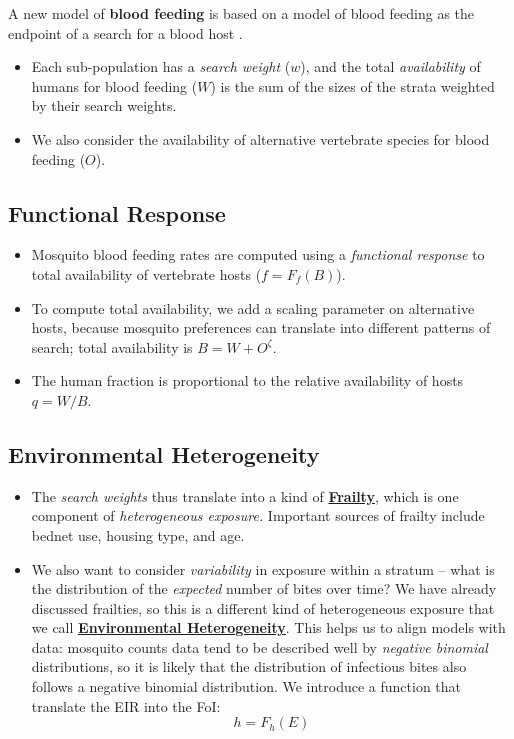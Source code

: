 \documentclass[
]{book}
\begin{document}
A new model of \textbf{blood feeding} is based on a model of blood feeding as the endpoint of a search for a blood host \autocite{WuSL2023SpatialDynamics}.

\begin{itemize}
\item
  Each sub-population has a \emph{search weight} (\(w\)), and the total \emph{availability} of humans for blood feeding (\(W\)) is the sum of the sizes of the strata weighted by their search weights.
\item
  We also consider the availability of alternative vertebrate species for blood feeding (\(O\)).
\end{itemize}

\subsection{Functional Response}\label{functional-response}

\begin{itemize}
\item
  Mosquito blood feeding rates are computed using a \emph{functional response} to total availability of vertebrate hosts (\(f = F_f(B)\)).
\item
  To compute total availability, we add a scaling parameter on alternative hosts, because mosquito preferences can translate into different patterns of search; total availability is \(B=W + O^\zeta\).
\item
  The human fraction is proportional to the relative availability of hosts \(q = W/B\).
\end{itemize}

\subsection{Environmental Heterogeneity}\label{environmental-heterogeneity}

\begin{itemize}
\item
  The \emph{search weights} thus translate into a kind of \textbf{\hyperref[frailtyCh]{Frailty}}, which is one component of \emph{heterogeneous exposure.} Important sources of frailty include bednet use, housing type, and age.
\item
  We also want to consider \emph{variability} in exposure within a stratum -- what is the distribution of the \emph{expected} number of bites over time? We have already discussed frailties, so this is a different kind of heterogeneous exposure that we call \textbf{\hyperref[environmental-heterogeneity]{Environmental Heterogeneity}}. This helps us to align models with data: mosquito counts data tend to be described well by \emph{negative binomial} distributions, so it is likely that the distribution of infectious bites also follows a negative binomial distribution. We introduce a function that translate the EIR into the FoI:
  \[h=F_h(E)\]
\end{itemize}
\end{document}
